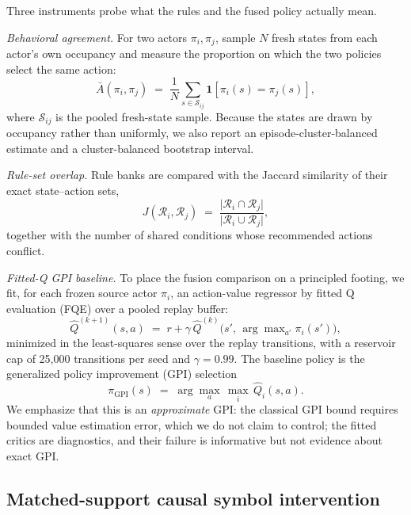 \documentclass[11pt]{article}
\begin{document}
Three instruments probe what the rules and the fused policy actually mean.

\emph{Behavioral agreement.} For two actors $\pi_i,\pi_j$, sample $N$ fresh states from each
actor's own occupancy and measure the proportion on which the two policies select the same action:
\begin{equation}
\bar{A}(\pi_i,\pi_j) \;=\; \frac{1}{N}\sum_{s\in\mathcal{S}_{ij}} \mathbf{1}[\pi_i(s)=\pi_j(s)],
\label{eq:agreement}
\end{equation}
where $\mathcal{S}_{ij}$ is the pooled fresh-state sample. Because the states are drawn by
occupancy rather than uniformly, we also report an episode-cluster-balanced estimate and a
cluster-balanced bootstrap interval.

\emph{Rule-set overlap.} Rule banks are compared with the Jaccard similarity of their exact
state--action sets,
\begin{equation}
J(\mathcal{R}_i,\mathcal{R}_j) \;=\; \frac{\lvert \mathcal{R}_i \cap \mathcal{R}_j \rvert}{\lvert \mathcal{R}_i \cup \mathcal{R}_j \rvert},
\label{eq:jaccard}
\end{equation}
together with the number of shared conditions whose recommended actions conflict.

\emph{Fitted-Q GPI baseline.} To place the fusion comparison on a principled footing, we fit, for
each frozen source actor $\pi_i$, an action-value regressor by fitted Q evaluation (FQE)
\cite{le2019batch,voloshin2021empirical} over a pooled replay buffer:
\begin{equation}
\hat{Q}^{(k+1)}(s,a) \;=\; r + \gamma\,\hat{Q}^{(k)}\big(s',\,\arg\max\nolimits_{a'}\pi_i(s')\big),
\label{eq:fqe}
\end{equation}
minimized in the least-squares sense over the replay transitions, with a reservoir cap of 25,000
transitions per seed and $\gamma=0.99$. The baseline policy is the generalized policy improvement
(GPI) selection \cite{sutton2018reinforcement}
\begin{equation}
\pi_{\mathrm{GPI}}(s) \;=\; \arg\max_{a}\,\max_{i}\,\hat{Q}_i(s,a).
\label{eq:gpi}
\end{equation}
We emphasize that this is an \emph{approximate} GPI: the classical GPI bound requires bounded value
estimation error, which we do not claim to control; the fitted critics are diagnostics, and their
failure is informative but not evidence about exact GPI.

\subsection{Matched-support causal symbol intervention}
\label{sec:method:causal}
\end{document}
